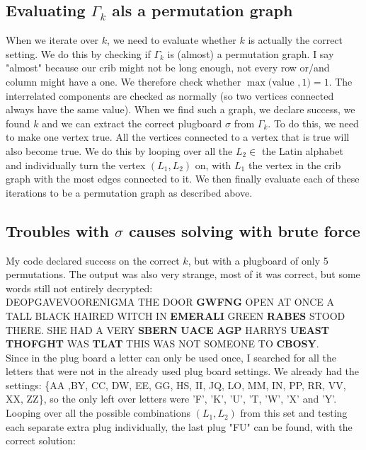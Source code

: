 \documentclass{article}
\begin{document}
\subsection{Evaluating $\Gamma_k$ als a permutation graph}

When we iterate over $k$, we need to evaluate whether $k$ is actually the correct setting. We do this by checking if $\Gamma_k$ is (almost) a permutation graph. I say "almost" because our crib might not be long enough, not every row or/and column might have a one. We therefore check whether $\max ($value $,1) = 1$. The interrelated components are checked as normally (so two vertices connected always have the same value). When we find such a graph, we declare success, we found $k$ and we can extract the correct plugboard $\sigma$ from $\Gamma_k$. To do this, we need to make one vertex true. All the vertices connected to a vertex that is true will also become true. We do this by looping over all the $L_2 \in $ the Latin alphabet and individually turn the vertex $(L_1, L_2)$ on, with $L_1$ the vertex in the crib graph with the most edges connected to it. We then finally evaluate each of these iterations to be a permutation graph as described above.

\subsection{Troubles with $\sigma$ causes solving with brute force}

My code declared success on the correct $k$, but with a plugboard of only 5 permutations. The output was also very strange, most of it was correct, but some words still not entirely decrypted:\\

DEOPGAVEVOORENIGMA THE DOOR \textbf{GWFNG} OPEN AT ONCE A TALL BLACK HAIRED WITCH IN \textbf{EMERALI} GREEN \textbf{RABES} STOOD  THERE. SHE HAD A VERY \textbf{SBERN} \textbf{UACE} \textbf{AGP} HARRYS \textbf{UEAST} \textbf{THOFGHT} WAS \textbf{TLAT} THIS WAS NOT SOMEONE TO \textbf{CBOSY}.\\

Since in the plug board a letter can only be used once, I searched for all the letters that were not in the already used plug board settings. We already had the settings: \{AA ,BY, CC, DW, EE, GG, HS, II,
JQ, LO, MM, IN, PP, RR, VV, XX, ZZ\}, so the only left over letters were 'F', 'K', 'U', 'T, 'W', 'X' and 'Y'. Looping over all the possible combinations $(L_1, L_2)$ from this set and testing each separate extra plug individually, the last plug "FU" can be found, with the correct solution:\\
\end{document}
